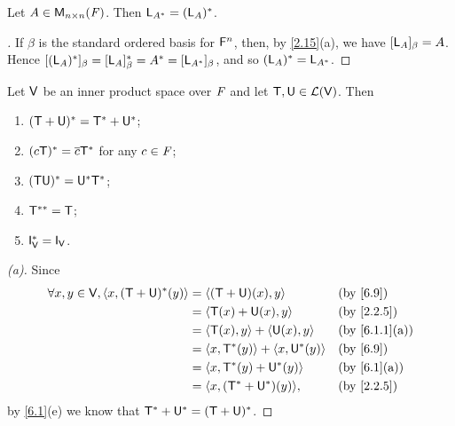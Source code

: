 \begin{cor}\label{6.3.1}
  Let \(A \in \mathsf{M}_{{n} \times n}({\mathit{F}})\).
  Then \(\mathsf{L}_{A^*} = (\mathsf{L}_A)^*\).
\end{cor}

\begin{proof}[]
  If \(\beta\) is the standard ordered basis for \(\mathsf{F}^n\), then, by \cref{2.15}(a), we have \([\mathsf{L}_A]_{\beta} = A\).
  Hence \([(\mathsf{L}_A)^*]_{\beta} = [\mathsf{L}_A]_{\beta}^* = A^* = [\mathsf{L}_{A^*}]_{\beta}\), and so \((\mathsf{L}_A)^* = \mathsf{L}_{A^*}\).
\end{proof}

\begin{thm}\label{6.11}
  Let \(\mathsf{V}\) be an inner product space over \(\mathit{F}\) and let \(\mathsf{T}, \mathsf{U} \in \mathcal{L}(\mathsf{V})\).
  Then
  \begin{enumerate}
    \item \((\mathsf{T} + \mathsf{U})^* = \mathsf{T}^* + \mathsf{U}^*\);
    \item \((c \mathsf{T})^* = \overline{c} \mathsf{T}^*\) for any \(c \in \mathit{F}\);
    \item \((\mathsf{T} \mathsf{U})^* = \mathsf{U}^* \mathsf{T}^*\);
    \item \(\mathsf{T}^{**} = \mathsf{T}\);
    \item \(\IT[\V]^* = \IT[\V]\).
  \end{enumerate}
\end{thm}

\begin{proof}[(a)]
  Since
  \begin{align*}
    \forall x, y \in \V, \inn{x, (\T + \U)^*(y)} & = \inn{(\T + \U)(x), y}               &  & \text{(by \cref{6.9})}      \\
                                                 & = \inn{\T(x) + \U(x), y}              &  & \text{(by \cref{2.2.5})}    \\
                                                 & = \inn{\T(x), y} + \inn{\U(x), y}     &  & \text{(by \cref{6.1.1}(a))} \\
                                                 & = \inn{x, \T^*(y)} + \inn{x, \U^*(y)} &  & \text{(by \cref{6.9})}      \\
                                                 & = \inn{x, \T^*(y) + \U^*(y)}          &  & \text{(by \cref{6.1}(a))}   \\
                                                 & = \inn{x, (\T^* + \U^*)(y)},          &  & \text{(by \cref{2.2.5})}
  \end{align*}
  by \cref{6.1}(e) we know that \(\mathsf{T}^* + \mathsf{U}^* = (\mathsf{T} + \mathsf{U})^*\).
\end{proof}

